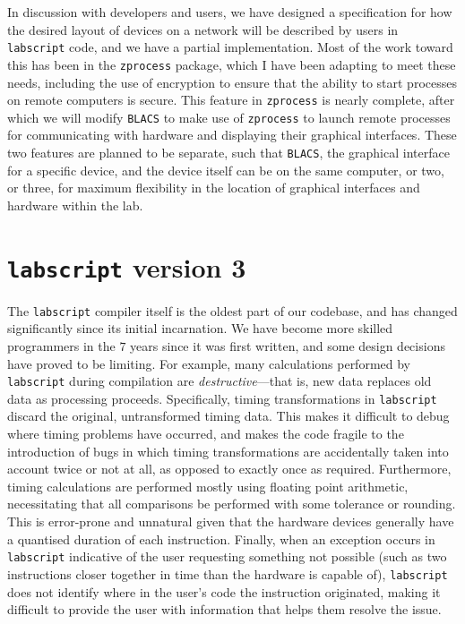 In discussion with developers and users, we have designed a specification for how the desired layout of devices on a network will be described by users in \texttt{labscript} code, and we have a partial implementation. Most of the work toward this has been in the \texttt{zprocess} package, which I have been adapting to meet these needs, including the use of encryption to ensure that the ability to start processes on remote computers is secure. This feature in \texttt{zprocess} is nearly complete, after which we will modify \texttt{BLACS} to make use of \texttt{zprocess} to launch remote processes for communicating with hardware and displaying their graphical interfaces. These two features are planned to be separate, such that \texttt{BLACS}, the graphical interface for a specific device, and the device itself can be on the same computer, or two, or three, for maximum flexibility in the location of graphical interfaces and hardware within the lab.

\section{\texttt{labscript} version 3}

The \texttt{labscript} compiler itself is the oldest part of our codebase, and has changed significantly since its initial incarnation. We have become more skilled programmers in the $7$ years since it was first written, and some design decisions have proved to be limiting. For example, many calculations performed by \texttt{labscript} during compilation are \emph{destructive}---that is, new data replaces old data as processing proceeds. Specifically, timing transformations in \texttt{labscript} discard the original, untransformed timing data. This makes it difficult to debug where timing problems have occurred, and makes the code fragile to the introduction of bugs in which timing transformations are accidentally taken into account twice or not at all, as opposed to exactly once as required. Furthermore, timing calculations are performed mostly using floating point arithmetic, necessitating that all comparisons be performed with some tolerance or rounding. This is error-prone and unnatural given that the hardware devices generally have a quantised duration of each instruction. Finally, when an exception occurs in \texttt{labscript} indicative of the user requesting something not possible (such as two instructions closer together in time than the hardware is capable of), \texttt{labscript} does not identify where in the user's code the instruction originated, making it difficult to provide the user with information that helps them resolve the issue.

